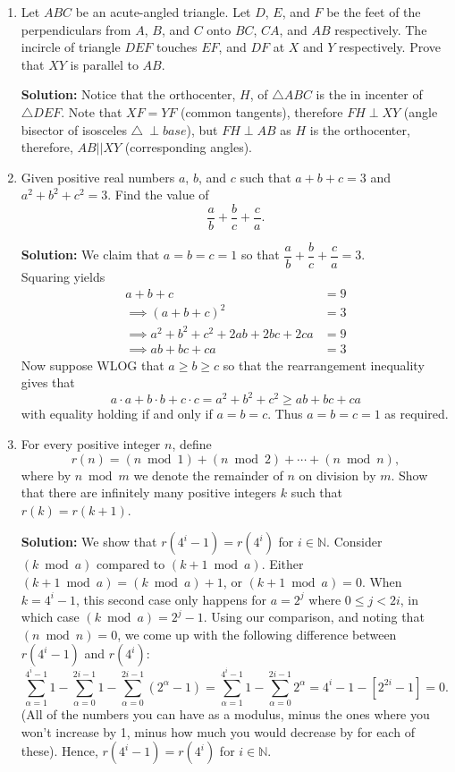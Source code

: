 \documentclass{article}
\begin{document}
\begin{enumerate}[itemsep=24pt]
\item %
Let $ABC$ be an acute-angled triangle. Let $D$, $E$, and $F$ be the feet of the perpendiculars from $A$, $B$, and $C$ onto $BC$, $CA$, and $AB$ respectively. The incircle of triangle $DEF$ touches $EF$, and $DF$ at $X$ and $Y$ respectively. Prove that $XY$ is parallel to $AB$.

\textbf{Solution:} Notice that the orthocenter, $H$, of $\triangle ABC$ is the in incenter of $\triangle DEF$. Note that $XF=YF$ (common tangents), therefore $FH \perp XY$ (angle bisector of isosceles $\triangle\ \perp base$), but $FH \perp AB$ as $H$ is the orthocenter, therefore, $AB || XY$ (corresponding angles).


\item %
Given positive real numbers $a$, $b$, and $c$ such that $a+b+c = 3$ and $a^2+b^2+c^2 = 3$. Find the value of \[\frac{a}{b} +\frac{b}{c} +\frac{c}{a}.\]

\textbf{Solution:} We claim that $a=b=c=1$ so that $\dfrac{a}{b} +\dfrac{b}{c} +\dfrac{c}{a} = 3$. 
\\ Squaring yields 
\begin{align*}
	a+b+c &= 9
	\\ \implies (a+b+c)^2 &= 3
	\\ \implies a^2+b^2+c^2 + 2ab + 2bc + 2ca &= 9
	\\ \implies ab + bc + ca &= 3
\end{align*}
Now suppose WLOG that $a \geq b \geq c$ so that the rearrangement inequality gives that
$$a \cdot a + b \cdot b + c \cdot c = a^2+b^2+c^2 \geq ab + bc +ca$$
with equality holding if and only if $a=b=c$. 
Thus $a=b=c=1$ as required. 


\item %
For every positive integer $n$, define \[ r(n) = (n \bmod 1) + (n \bmod 2) + \dotsb + (n \bmod n), \]
where by $n \bmod m$ we denote the remainder of $n$ on division by $m$.
Show that there are infinitely many positive integers $k$ such that $r(k) = r(k+1)$.

\textbf{Solution:} We show that $r(4^i-1) = r(4^i)$ for $i\in \mathbb{N}$. Consider $({k\bmod a})$ compared to $({k+1\bmod a})$. Either $({k+1\bmod a}) = ({k\bmod a})+1$, or $({k+1\bmod a}) = 0$. When $k = 4^i-1$, this second case only happens for $a = 2^j$ where $0 \leq j < 2i$, in which case $({k \bmod a}) = 2^j-1$. Using our comparison, and noting that $({n \bmod n})=0$, we come up with the following difference between $r(4^i-1)$ and $r(4^i)$:
$$ \sum_{\alpha=1}^{4^i-1}1 - \sum_{\alpha=0}^{2i-1}1 - \sum_{\alpha=0}^{2i-1} (2^{\alpha}-1) = \sum_{\alpha=1}^{4^i-1}1 - \sum_{\alpha=0}^{2i-1} 2^{\alpha} = 4^i-1 - [2^{2i}-1] = 0. $$
(All of the numbers you can have as a modulus, minus the ones where you won't increase by 1, minus how much you would decrease by for each of these).
Hence, $r(4^i-1) = r(4^i)$ for $i\in \mathbb{N}$.

\end{enumerate}
\end{document}
